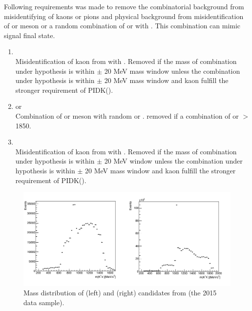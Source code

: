 Following requirements was made to remove the combinatorial background from misidentifying of kaons or pions and physical background from misidentification of \Dp or \Lc meson or a random combination of \kaon or \pion with \Dz. This combination can mimic signal final state.

\begin{enumerate}
   \item \Dp\to\Kp\pip\pim \\ 
   Misidentification of kaon from \Ds\to\Kp\Km\pip with \Dp\to\Kp\pim\pip. Removed if the mass of combination under \pion hypothesis is within \Dp $\pm$ 20 MeV mass window unless the combination under \kaon hypothesis is within \Ds $\pm$ 20 MeV mass window and kaon fulfill the stronger requirement of PIDK(\kaon).
   
   \item \Dz\to\Kp\pim or \Dz\to\Kp\Km \\ 
    Combination of \Dz\to\Kp\Km or \Dz\to\Kp\Km meson with random \Kp or \pip. removed if a combination of \Kp\pim or \Kp\Km  $>$ 1850. 
    
   \item \Lc\to\Kp\proton\pim \\ 
   Misidentification of kaon from \Ds\to\Kp\Km\pip with \Lc\to\Kp\proton\pip. Removed if the mass of combination under \proton hypothesis is within \Lc $\pm$ 20 MeV window unless the combination under \kaon hypothesis is within \Ds $\pm$ 20 MeV mass window and kaon fulfill the stronger requirement of PIDK(\kaon).
 \end{enumerate}
 
 
\begin{figure}[h!]
\includegraphics[width=14cm]{figs/Selection/reso.png}
\centering
\caption{Mass distribution of \Kp\Km (left) and \Kp\pim (right) candidates from \Ds\to\Kp\Km\pim (the 2015 data sample).}
\label{fig:reso}
\end{figure}

